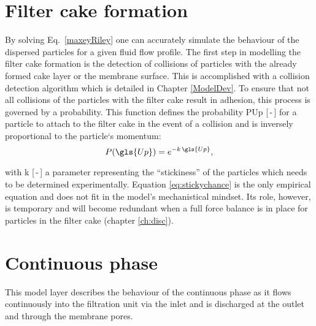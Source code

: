   \section{Filter cake formation}
 By solving Eq.\ \eqref{maxeyRiley} one can accurately simulate the behaviour of the dispersed particles for a given fluid flow profile. %
 The first step in modelling the filter cake formation is the detection of collisions of particles with the already formed cake layer or the membrane surface. This is accomplished with a collision detection algorithm which is detailed in Chapter \ref{ModelDev}. To ensure that not all collisions of the particles with the filter cake result in adhesion, this process is governed by a probability. This function defines the probability \gls{PUp} [\,-\,] for a particle to attach to the filter cake in the event of a collision and is inversely proportional to the particle`s momentum:
 \begin{equation}
	P(\gls{Up}) = e^{-k\, \gls{Up}},
	\label{eq:stickychance}
\end{equation}

with \gls{k} [\,-\,] a parameter representing the ``stickiness'' of the particles which needs to be determined experimentally.
Equation \eqref{eq:stickychance} is the only empirical equation and does not fit in the model's mechanistical mindset. Its role, however, is temporary and will become redundant when a full force balance is in place for particles in the filter cake (chapter \ref{ch:disc}).

\section{Continuous phase}
This model layer describes the behaviour of the continuous phase as it flows continuously into the filtration unit via the inlet and is discharged at the outlet and through the membrane pores.
